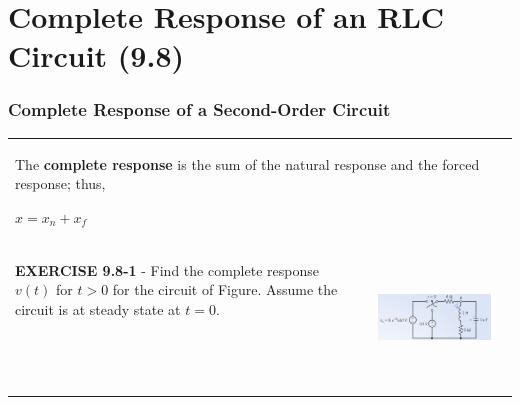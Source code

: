 \documentclass[aspectratio=169]{beamer}
\begin{document}
\section{Complete Response of an RLC Circuit (9.8)}
\begin{frame}[fragile]
	\frametitle{Complete Response of a Second-Order Circuit}

    		\begin{tabular}{ll}		
    		\begin{columns}
		\begin{column}{1\textwidth}  %
 The \textbf{complete response} is the sum of the natural response and the forced response; thus,
\begin{center} $x= x_n + x_f$ \end{center}
		\end{column}
	        \end{columns}\\	
	\begin{columns}
	  \begin{column}{.5\textwidth}  %
	\textbf{EXERCISE 9.8-1} - 
	Find the complete response $v(t)$ for $t > 0$ for the circuit of
Figure. Assume the circuit is at steady state at $t = 0$.

	  \end{column}
	  \begin{column}{.5\textwidth}  %
	\begin{center}
    			\includegraphics[height=3cm]{figure11.png}	
		\end{center}	
	  \end{column}
	\end{columns}
\end{tabular}	

\end{frame}
\end{document}
